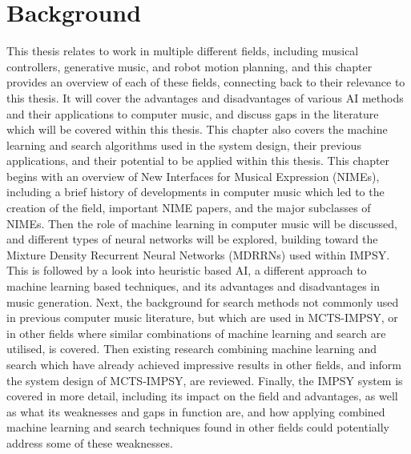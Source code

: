 \chapter{Background}\label{chap:background}
This thesis relates to work in multiple different fields, including musical controllers, generative music, and robot motion planning, and this chapter provides an overview of each of these fields, connecting back to their relevance to this thesis. It will cover the advantages and disadvantages of various AI methods and their applications to computer music, and discuss gaps in the literature which will be covered within this thesis. This chapter also covers the machine learning and search algorithms used in the system design, their previous applications, and their potential to be applied within this thesis. This chapter begins with an overview of New Interfaces for Musical Expression (NIMEs), including a brief history of developments in computer music which led to the creation of the field, important NIME papers, and the major subclasses of NIMEs. Then the role of machine learning in computer music will be discussed, and different types of neural networks will be explored, building toward the Mixture Density Recurrent Neural Networks (MDRRNs) used within IMPSY. This is followed by a look into heuristic based AI, a different approach to machine learning based techniques, and its advantages and disadvantages in music generation. Next, the background for search methods not commonly used in previous computer music literature, but which are used in MCTS-IMPSY, or in other fields where similar combinations of machine learning and search are utilised, is covered. Then existing research combining machine learning and search which have already achieved impressive results in other fields, and inform the system design of MCTS-IMPSY, are reviewed. Finally, the IMPSY system is covered in more detail, including its impact on the field and advantages, as well as what its weaknesses and gaps in function are, and how applying combined machine learning and search techniques found in other fields could potentially address some of these weaknesses.

